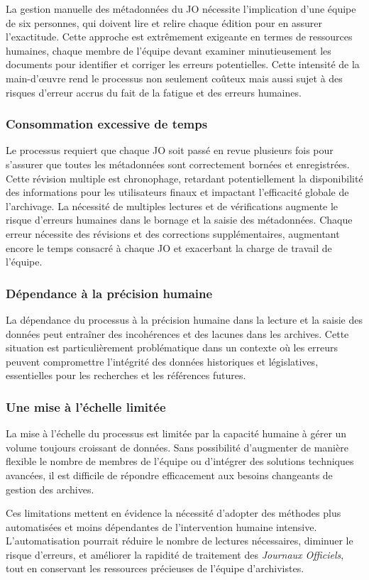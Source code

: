 La gestion manuelle des métadonnées du \gls{JO} nécessite l'implication d'une équipe de six personnes, qui doivent lire et relire chaque édition pour en assurer l'exactitude. Cette approche est extrêmement exigeante en termes de ressources humaines, chaque membre de l'équipe devant examiner minutieusement les documents pour identifier et corriger les erreurs potentielles. Cette intensité de la main-d'œuvre rend le processus non seulement coûteux mais aussi sujet à des risques d'erreur accrus du fait de la fatigue et des erreurs humaines.

\subsubsection{Consommation excessive de temps}

Le processus requiert que chaque \gls{JO} soit passé en revue plusieurs fois pour s'assurer que toutes les métadonnées sont correctement bornées et enregistrées. Cette révision multiple est chronophage, retardant potentiellement la disponibilité des informations pour les utilisateurs finaux et impactant l'efficacité globale de l'archivage. La nécessité de multiples lectures et de vérifications augmente le risque d'erreurs humaines dans le bornage et la saisie des métadonnées. Chaque erreur nécessite des révisions et des corrections supplémentaires, augmentant encore le temps consacré à chaque \gls{JO} et exacerbant la charge de travail de l'équipe.

\subsubsection{Dépendance à la précision humaine}

La dépendance du processus à la précision humaine dans la lecture et la saisie des données peut entraîner des incohérences et des lacunes dans les archives. Cette situation est particulièrement problématique dans un contexte où les erreurs peuvent compromettre l'intégrité des données historiques et législatives, essentielles pour les recherches et les références futures.

\subsubsection{Une mise à l’échelle limitée}

La mise à l’échelle du processus est limitée par la capacité humaine à gérer un volume toujours croissant de données. Sans possibilité d'augmenter de manière flexible le nombre de membres de l'équipe ou d'intégrer des solutions techniques avancées, il est difficile de répondre efficacement aux besoins changeants de gestion des archives.

Ces limitations mettent en évidence la nécessité d'adopter des méthodes plus automatisées et moins dépendantes de l'intervention humaine intensive. L'automatisation pourrait réduire le nombre de lectures nécessaires, diminuer le risque d'erreurs, et améliorer la rapidité de traitement des \textit{Journaux Officiels}, tout en conservant les ressources précieuses de l'équipe d'archivistes.